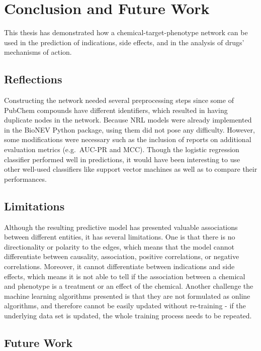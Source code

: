 \chapter{Conclusion and Future Work}\label{conclusion}

This thesis has demonstrated how a chemical-target-phenotype network can be used in the prediction of indications, side effects, and in the analysis of drugs' mechanisms of action.

\section{Reflections}

Constructing the network needed several preprocessing steps since some of PubChem compounds have different identifiers, which resulted in having duplicate nodes in the network.
Because \ac{NRL} models were already implemented in the BioNEV Python package, using them did not pose any difficulty.
However, some modifications were necessary such as the inclusion of reports on additional evaluation metrics (e.g.\ AUC-PR and \ac{MCC}).
Though the logistic regression classifier performed well in predictions, it would have been interesting to use other well-used classifiers like support vector machines as well as to compare their performances.

\section{Limitations}

Although the resulting predictive model has presented valuable associations between different entities, it has several limitations.
One is that there is no directionality or polarity to the edges, which means that the model cannot differentiate between causality, association, positive correlations, or negative correlations.
Moreover, it cannot differentiate between indications and side effects, which means it is not able to tell if the association between a chemical and phenotype is a treatment or an effect of the chemical.
Another challenge the machine learning algorithms presented is that they are not formulated as online algorithms, and therefore cannot be easily updated without re-training - if the underlying data set is updated, the whole training process needs to be repeated.

\section{Future Work}

